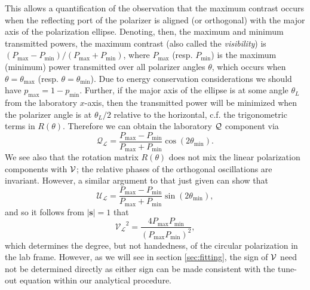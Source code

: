 	This allows a quantification of the observation that the maximum contrast occurs when the reflecting port of the polarizer is aligned (or orthogonal) with the major axis of the polarization ellipse.
	Denoting, then, the maximum and minimum transmitted powers, the maximum contrast (also called the \emph{visibility}) is $(P_\textrm{max}-P_\textrm{min})/(P_\textrm{max}+P_\textrm{min})$, where $P_\textrm{max}$ (resp. $P_\textrm{min}$) is the maximum (minimum) power transmitted over all polarizer angles $\theta$, which occurs when $\theta=\theta_\textrm{max}$ (resp. $\theta=\theta_\textrm{min}$). 
	Due to energy conservation considerations we should have $p_\textrm{max} = 1 - p_\textrm{min}$. 
	Further, if the major axis of the ellipse is at some angle $\theta_L$ from the laboratory $x$-axis, then the transmitted power will be minimized when the polarizer angle is at $\theta_L/2$ relative to the horizontal, c.f. the trigonometric terms in $R(\theta)$.
	Therefore we can obtain the laboratory $\mathcal{Q}$ component via 
	\begin{equation}
		\mathcal{Q_{L}} =\frac{P_{\mathrm{max}}-P_{\mathrm{min}}}{P_{\mathrm{max}}+P_{\mathrm{min}}} \cos(2\theta_{\mathrm{min}}).
	\end{equation}
	We see also that the rotation matrix $R(\theta)$ does not mix the linear polarization components with $\mathcal{V}$; the relative phases of the orthogonal oscillations are invariant.
	However, a similar argument to that just given can show that 
	\begin{equation}
		\mathcal{U_{L}} =\frac{P_{\mathrm{max}}-P_{\mathrm{min}}}{P_{\mathrm{max}}+P_{\mathrm{min}}} \sin(2\theta_{\mathrm{min}}),
	\end{equation}
	and so it follows from $|\mathbf{s}|=1$ that
	\begin{equation}
		\mathcal{V_{L}}^2 =\frac{4 P_\textrm{max}P_\textrm{min}}{(P_\textrm{max}P_\textrm{min})^2},
	\end{equation}
	which determines the degree, but not handedness, of the circular polarization in the lab frame.
	However, as we will see in section \ref{sec:fitting}, the sign of $\mathcal{V}$ need not be determined directly as either sign can be made consistent with the tune-out equation within our analytical procedure.


